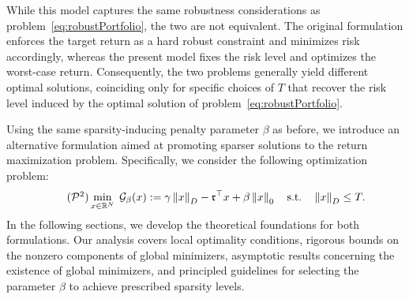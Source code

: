 \documentclass[11pt]{article}
\theoremstyle{plain}
\theoremstyle{definition}
\theoremstyle{plain}
\newcommand{\RR}{{\mathbb R}} %
\newcommand{\norm}[1]{\left\lVert#1\right\rVert}
\newcommand{\tpose}[1]{#1^{\top}}
\newcommand{\cG}{{\mathcal G}}
\newcommand{\cP}{{\mathcal P}}
\newcommand{\ccr}{{\mathfrak r}}
\begin{document}
While this model captures the same robustness considerations as problem~\eqref{eq:robustPortfolio}, the two are not equivalent. The original formulation enforces the target return as a hard robust constraint and minimizes risk accordingly, whereas the present model fixes the risk level and optimizes the worst-case return. Consequently, the two problems generally yield different optimal solutions, coinciding only for specific choices of $T$ that recover the risk level induced by the optimal solution of problem~\eqref{eq:robustPortfolio}.

Using the same sparsity-inducing penalty parameter $\beta$ as before, we introduce an alternative formulation aimed at promoting sparser solutions to the return maximization problem. Specifically, we consider the following optimization problem:
\begin{align}
\tag{$\cP^2$}\label{prob:cprmvp2}
\min_{x\in\RR^N} \;\cG_\beta(x):=
\gamma \norm{x}_D - \tpose{\ccr} x + \beta\norm{x}_0
\quad \text{s.t.} \quad
\norm{x}_D \leq T .
\end{align}
In the following sections, we develop the theoretical foundations for both formulations. Our analysis covers local optimality conditions, rigorous bounds on the nonzero components of global minimizers, asymptotic results concerning the existence of global minimizers, and principled guidelines for selecting the parameter $\beta$ to achieve prescribed sparsity levels.
\end{document}
